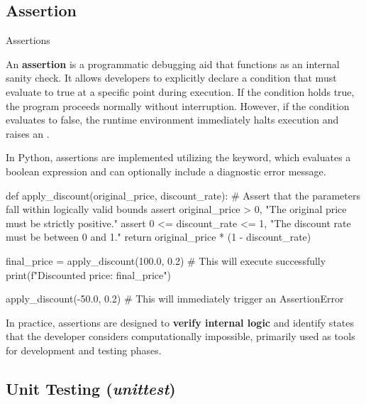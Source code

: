 \documentclass[10pt]{article}
\begin{document}
  \subsection{Assertion}

    \begin{core}{Assertions}

      An \textbf{assertion} is a programmatic debugging aid that functions as an internal sanity check. It allows developers to explicitly declare a condition that must evaluate to true at a specific point during execution. If the condition holds true, the program proceeds normally without interruption. However, if the condition evaluates to false, the runtime environment immediately halts execution and raises an .

      In Python, assertions are implemented utilizing the  keyword, which evaluates a boolean expression and can optionally include a diagnostic error message.

      \begin{pyconsole}

        def apply_discount(original_price, discount_rate):
            # Assert that the parameters fall within logically valid bounds
            assert original_price > 0, "The original price must be strictly positive."
            assert 0 <= discount_rate <= 1, "The discount rate must be between 0 and 1."
            return original_price * (1 - discount_rate)

        final_price = apply_discount(100.0, 0.2) # This will execute successfully
        print(f"Discounted price: {final_price}")

        apply_discount(-50.0, 0.2) # This will immediately trigger an AssertionError

      \end{pyconsole}

      In practice, assertions are designed to \textbf{verify internal logic} and identify states that the developer considers computationally impossible, primarily used as tools for development and testing phases. 

    \end{core}

  \subsection{Unit Testing (\textit{unittest})}
\end{document}
